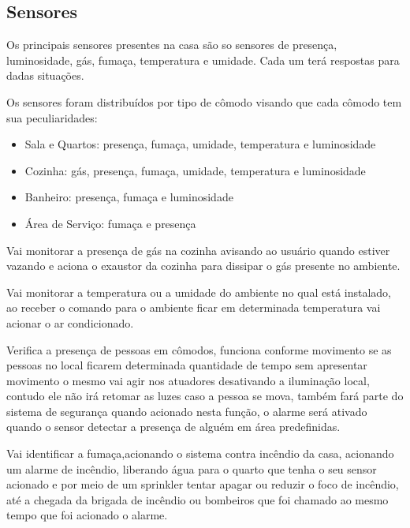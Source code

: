 	       \subsection{Sensores}
	            \par Os principais sensores presentes na casa são so sensores de presença, luminosidade, gás, fumaça, temperatura e umidade. Cada um terá respostas para dadas situações.
	            \par Os sensores foram distribuídos por tipo de cômodo visando que cada cômodo tem sua peculiaridades:
	            \begin{itemize}
	                \item Sala e Quartos: presença, fumaça, umidade, temperatura e luminosidade
                    \item Cozinha: gás, presença, fumaça, umidade, temperatura e luminosidade
                    \item Banheiro: presença, fumaça e luminosidade
                    \item Área de Serviço: fumaça e presença
	            \end{itemize}
	                \par Vai monitorar a presença de gás na cozinha avisando ao usuário quando estiver vazando e aciona o exaustor da cozinha para dissipar o gás presente no ambiente.
	                \par Vai monitorar a temperatura ou a umidade do ambiente no qual está instalado, ao receber o comando para o ambiente ficar em determinada temperatura vai acionar o ar condicionado.
	                \par Verifica a presença de pessoas em cômodos, funciona conforme movimento se as pessoas no local ficarem determinada quantidade de tempo sem apresentar movimento o mesmo vai agir nos atuadores desativando a iluminação local, contudo ele não irá retomar as luzes caso a pessoa se mova, também fará parte do sistema de segurança quando acionado nesta função, o alarme será ativado quando o sensor detectar a presença de alguém em área predefinidas.
	                \par Vai identificar a fumaça,acionando o sistema contra incêndio da casa, acionando um alarme de incêndio, liberando água para o quarto que tenha o seu sensor acionado e por meio de um sprinkler tentar apagar ou reduzir o foco de incêndio, até a chegada da brigada de incêndio ou bombeiros que foi chamado ao mesmo tempo que foi acionado o alarme.
	                
